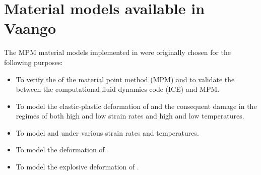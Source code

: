 \section{Material models available in Vaango}
The MPM material models implemented in \Vaango were originally
chosen for the following purposes:
\begin{itemize}
  \item To verify the  of the material point method (MPM)
        and to validate the  between the computational fluid 
        dynamics code (ICE) and MPM.
  \item To model the elastic-plastic deformation of  
        and the consequent damage in the regimes of 
        both high and low strain rates and high and low temperatures.
  \item To model  and 
        under various strain rates and temperatures.
  \item To model the deformation of .
  \item To model the explosive deformation of .
\end{itemize}

